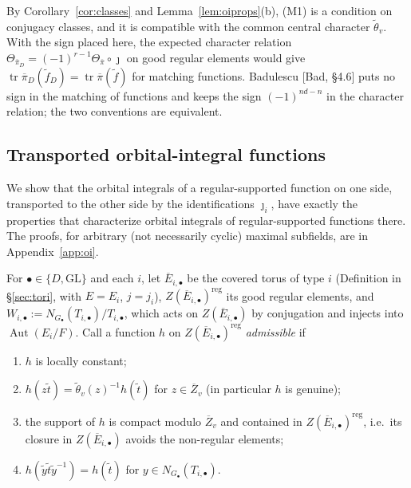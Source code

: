 \documentclass[12pt]{article}
\newcommand{\ov}[1]{\overline{#1}}
\newcommand{\reg}{\mathrm{reg}}
\newcommand{\tr}{\operatorname{tr}}
\newcommand{\Aut}{\operatorname{Aut}}
\newcommand{\GL}{\mathrm{GL}}
\newcommand{\Zb}{\ov{Z}}
\newcommand{\pib}{\ov{\pi}}
\newcommand{\Eb}{\ov{E}}
\newcommand{\jj}{\jmath}
\theoremstyle{plain}
\theoremstyle{definition}
\begin{document}
By Corollary~\ref{cor:classes} and Lemma~\ref{lem:oiprops}(b), (M1) is a condition on conjugacy classes, and it is compatible with the common central character $\tilde\theta_v$. With the sign placed here, the expected character relation $\Theta_{\pib_D}=(-1)^{r-1}\Theta_{\pib}\circ\jj$ on good regular elements would give $\tr\pib_D(\tilde f_D)=\tr\pib(\tilde f)$ for matching functions. Badulescu [Bad, \S4.6] puts no sign in the matching of functions and keeps the sign $(-1)^{nd-n}$ in the character relation; the two conventions are equivalent.

\subsection{Transported orbital-integral functions}\label{subsec:transported}
We show that the orbital integrals of a regular-supported function on one side, transported to the other side by the identifications $\jj_i$, have exactly the properties that characterize orbital integrals of regular-supported functions there. The proofs, for arbitrary (not necessarily cyclic) maximal subfields, are in Appendix~\ref{app:oi}.

For $\bullet\in\{D,\GL\}$ and each $i$, let $\Eb_{i,\bullet}$ be the covered torus of type $i$ (Definition in \S\ref{sec:tori}, with $E=E_i$, $j=j_i$), $Z(\Eb_{i,\bullet})^{\reg}$ its good regular elements, and $W_{i,\bullet}:=N_{G_\bullet}(T_{i,\bullet})/T_{i,\bullet}$, which acts on $Z(\Eb_{i,\bullet})$ by conjugation and injects into $\Aut(E_i/F)$. Call a function $h$ on $Z(\Eb_{i,\bullet})^{\reg}$ \emph{admissible} if
\begin{enumerate}[label=(\roman*)]
\item $h$ is locally constant;
\item $h(z\tilde t)=\tilde\theta_v(z)^{-1}h(\tilde t)$ for $z\in\Zb_v$ (in particular $h$ is genuine);
\item the support of $h$ is compact modulo $\Zb_v$ and contained in $Z(\Eb_{i,\bullet})^{\reg}$, i.e.\ its closure in $Z(\Eb_{i,\bullet})$ avoids the non-regular elements;
\item $h(\tilde y\tilde t\tilde y^{-1})=h(\tilde t)$ for $y\in N_{G_\bullet}(T_{i,\bullet})$.
\end{enumerate}
\end{document}
